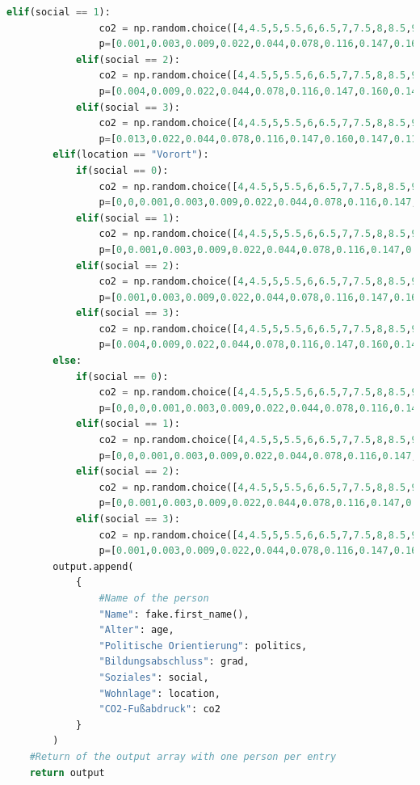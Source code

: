 \documentclass[a4paper,12pt]{report}
\begin{document}
\begin{lstlisting}[language=Python,label={lst:Sz2Z3},caption=Dritte Zelle für das Generieren der Daten]
            elif(social == 1):
                co2 = np.random.choice([4,4.5,5,5.5,6,6.5,7,7.5,8,8.5,9,9.5,10,10.5,11,11.5,12], 
                p=[0.001,0.003,0.009,0.022,0.044,0.078,0.116,0.147,0.160,0.147,0.116,0.078,0.044,0.022,0.009,0.003,0.001])
            elif(social == 2):
                co2 = np.random.choice([4,4.5,5,5.5,6,6.5,7,7.5,8,8.5,9,9.5,10,10.5,11,11.5,12], 
                p=[0.004,0.009,0.022,0.044,0.078,0.116,0.147,0.160,0.147,0.116,0.078,0.044,0.022,0.009,0.003,0.001,0])
            elif(social == 3):
                co2 = np.random.choice([4,4.5,5,5.5,6,6.5,7,7.5,8,8.5,9,9.5,10,10.5,11,11.5,12], 
                p=[0.013,0.022,0.044,0.078,0.116,0.147,0.160,0.147,0.116,0.078,0.044,0.022,0.009,0.003,0.001,0,0])
        elif(location == "Vorort"):
            if(social == 0):
                co2 = np.random.choice([4,4.5,5,5.5,6,6.5,7,7.5,8,8.5,9,9.5,10,10.5,11,11.5,12], 
                p=[0,0,0.001,0.003,0.009,0.022,0.044,0.078,0.116,0.147,0.160,0.147,0.116,0.078,0.044,0.022,0.013])
            elif(social == 1):
                co2 = np.random.choice([4,4.5,5,5.5,6,6.5,7,7.5,8,8.5,9,9.5,10,10.5,11,11.5,12], 
                p=[0,0.001,0.003,0.009,0.022,0.044,0.078,0.116,0.147,0.160,0.147,0.116,0.078,0.044,0.022,0.009,0.004])
            elif(social == 2):
                co2 = np.random.choice([4,4.5,5,5.5,6,6.5,7,7.5,8,8.5,9,9.5,10,10.5,11,11.5,12], 
                p=[0.001,0.003,0.009,0.022,0.044,0.078,0.116,0.147,0.160,0.147,0.116,0.078,0.044,0.022,0.009,0.003,0.001])
            elif(social == 3):
                co2 = np.random.choice([4,4.5,5,5.5,6,6.5,7,7.5,8,8.5,9,9.5,10,10.5,11,11.5,12], 
                p=[0.004,0.009,0.022,0.044,0.078,0.116,0.147,0.160,0.147,0.116,0.078,0.044,0.022,0.009,0.003,0.001,0])
        else:
            if(social == 0):
                co2 = np.random.choice([4,4.5,5,5.5,6,6.5,7,7.5,8,8.5,9,9.5,10,10.5,11,11.5,12], 
                p=[0,0,0,0.001,0.003,0.009,0.022,0.044,0.078,0.116,0.147,0.160,0.147,0.116,0.078,0.044,0.035])
            elif(social == 1):
                co2 = np.random.choice([4,4.5,5,5.5,6,6.5,7,7.5,8,8.5,9,9.5,10,10.5,11,11.5,12], 
                p=[0,0,0.001,0.003,0.009,0.022,0.044,0.078,0.116,0.147,0.160,0.147,0.116,0.078,0.044,0.022,0.013])
            elif(social == 2):
                co2 = np.random.choice([4,4.5,5,5.5,6,6.5,7,7.5,8,8.5,9,9.5,10,10.5,11,11.5,12], 
                p=[0,0.001,0.003,0.009,0.022,0.044,0.078,0.116,0.147,0.160,0.147,0.116,0.078,0.044,0.022,0.009,0.004])
            elif(social == 3):
                co2 = np.random.choice([4,4.5,5,5.5,6,6.5,7,7.5,8,8.5,9,9.5,10,10.5,11,11.5,12], 
                p=[0.001,0.003,0.009,0.022,0.044,0.078,0.116,0.147,0.160,0.147,0.116,0.078,0.044,0.022,0.009,0.003,0.001])
        output.append(
            {
                #Name of the person
                "Name": fake.first_name(),
                "Alter": age,
                "Politische Orientierung": politics,
                "Bildungsabschluss": grad,
                "Soziales": social,
                "Wohnlage": location,
                "CO2-Fußabdruck": co2
            }  
        )
    #Return of the output array with one person per entry
    return output
\end{lstlisting}
\end{document}
